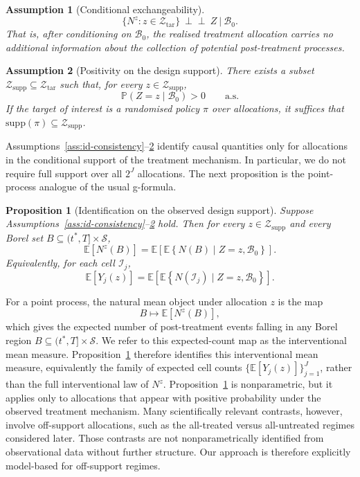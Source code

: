 \documentclass{statsoc}
\newtheorem{proposition}[proposition]{Proposition}
\newtheorem{assumption}[assumption]{Assumption}
\newcommand{\bbE}{\mathbb{E}}
\newcommand{\bbP}{\mathbb{P}}
\newcommand{\1}{\mathbbm{1}}
\newcommand{\Nproc}{N}
\begin{document}
\begin{assumption}[Conditional exchangeability]\label{ass:id-exchange}
\[
\{\Nproc^z:z\in\mathcal Z_{\mathrm{tar}}\}\ \perp\!\!\!\perp\ Z\ \big|\ \mathcal B_0.
\]
That is, after conditioning on \(\mathcal B_0\), the realised treatment allocation carries no additional information about the collection of potential post-treatment processes.
\end{assumption}

\begin{assumption}[Positivity on the design support]\label{ass:id-positivity}
There exists a subset \(\mathcal Z_{\mathrm{supp}}\subseteq \mathcal Z_{\mathrm{tar}}\) such that, for every \(z\in\mathcal Z_{\mathrm{supp}}\),
\[
\bbP(Z=z\mid \mathcal B_0)>0\qquad\text{a.s.}
\]
If the target of interest is a randomised policy \(\pi\) over allocations, it suffices that \(\mathrm{supp}(\pi)\subseteq \mathcal Z_{\mathrm{supp}}\).
\end{assumption}

Assumptions~\ref{ass:id-consistency}--\ref{ass:id-positivity} identify causal quantities only for allocations in the conditional support of the treatment mechanism. In particular, we do not require full support over all \(2^J\) allocations. The next proposition is the point-process analogue of the usual g-formula.

\begin{proposition}[Identification on the observed design support]\label{prop:id-onsupport}
Suppose Assumptions~\ref{ass:id-consistency}--\ref{ass:id-positivity} hold. Then for every \(z\in\mathcal Z_{\mathrm{supp}}\) and every Borel set \(B\subseteq (t^\ast,T]\times\mathcal S\),
\[
\bbE\!\left[\Nproc^z(B)\right]
=
\bbE\!\left[\bbE\!\left\{\Nproc(B)\mid Z=z,\mathcal B_0\right\}\right].
\]
Equivalently, for each cell \(\mathcal I_j\),
\[
\bbE\!\left[Y_j(z)\right]
=
\bbE\!\left[\bbE\!\left\{\Nproc(\mathcal I_j)\mid Z=z,\mathcal B_0\right\}\right].
\]
\end{proposition}


For a point process, the natural mean object under allocation \(z\) is the map
\[
B \mapsto \bbE[\Nproc^z(B)],
\]
which gives the expected number of post-treatment events falling in any Borel region \(B \subseteq (t^\ast,T]\times\mathcal S\). We refer to this expected-count map as the interventional mean measure. Proposition~\ref{prop:id-onsupport} therefore identifies this interventional mean measure, equivalently the family of expected cell counts \(\{\bbE[Y_j(z)]\}_{j=1}^J\), rather than the full interventional law of \(\Nproc^z\). Proposition~\ref{prop:id-onsupport} is nonparametric, but it applies only to allocations that appear with positive probability under the observed treatment mechanism. Many scientifically relevant contrasts, however, involve off-support allocations, such as the all-treated versus all-untreated regimes considered later. Those contrasts are not nonparametrically identified from observational data without further structure. Our approach is therefore explicitly model-based for off-support regimes.
\end{document}
